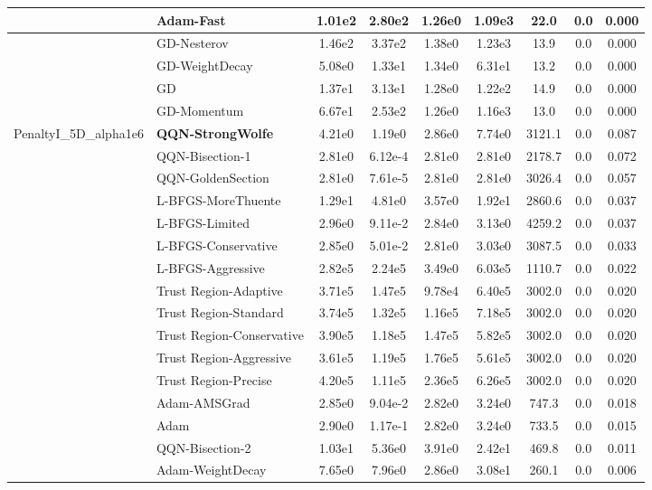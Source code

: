 \documentclass[10pt]{article}
\begin{document}
\begin{longtable}{|l|l|c|c|c|c|c|c|c|}
\hline
 & Adam-Fast & 1.01e2 & 2.80e2 & 1.26e0 & 1.09e3 & 22.0 & 0.0 & 0.000 \\
\hline
 & GD-Nesterov & 1.46e2 & 3.37e2 & 1.38e0 & 1.23e3 & 13.9 & 0.0 & 0.000 \\
\hline
 & GD-WeightDecay & 5.08e0 & 1.33e1 & 1.34e0 & 6.31e1 & 13.2 & 0.0 & 0.000 \\
\hline
 & GD & 1.37e1 & 3.13e1 & 1.28e0 & 1.22e2 & 14.9 & 0.0 & 0.000 \\
\hline
 & GD-Momentum & 6.67e1 & 2.53e2 & 1.26e0 & 1.16e3 & 13.0 & 0.0 & 0.000 \\
PenaltyI\_5D\_alpha1e6 & \textbf{QQN-StrongWolfe} & 4.21e0 & 1.19e0 & 2.86e0 & 7.74e0 & 3121.1 & 0.0 & 0.087 \\
\hline
 & QQN-Bisection-1 & 2.81e0 & 6.12e-4 & 2.81e0 & 2.81e0 & 2178.7 & 0.0 & 0.072 \\
\hline
 & QQN-GoldenSection & 2.81e0 & 7.61e-5 & 2.81e0 & 2.81e0 & 3026.4 & 0.0 & 0.057 \\
\hline
 & L-BFGS-MoreThuente & 1.29e1 & 4.81e0 & 3.57e0 & 1.92e1 & 2860.6 & 0.0 & 0.037 \\
\hline
 & L-BFGS-Limited & 2.96e0 & 9.11e-2 & 2.84e0 & 3.13e0 & 4259.2 & 0.0 & 0.037 \\
\hline
 & L-BFGS-Conservative & 2.85e0 & 5.01e-2 & 2.81e0 & 3.03e0 & 3087.5 & 0.0 & 0.033 \\
\hline
 & L-BFGS-Aggressive & 2.82e5 & 2.24e5 & 3.49e0 & 6.03e5 & 1110.7 & 0.0 & 0.022 \\
\hline
 & Trust Region-Adaptive & 3.71e5 & 1.47e5 & 9.78e4 & 6.40e5 & 3002.0 & 0.0 & 0.020 \\
\hline
 & Trust Region-Standard & 3.74e5 & 1.32e5 & 1.16e5 & 7.18e5 & 3002.0 & 0.0 & 0.020 \\
\hline
 & Trust Region-Conservative & 3.90e5 & 1.18e5 & 1.47e5 & 5.82e5 & 3002.0 & 0.0 & 0.020 \\
\hline
 & Trust Region-Aggressive & 3.61e5 & 1.19e5 & 1.76e5 & 5.61e5 & 3002.0 & 0.0 & 0.020 \\
\hline
 & Trust Region-Precise & 4.20e5 & 1.11e5 & 2.36e5 & 6.26e5 & 3002.0 & 0.0 & 0.020 \\
\hline
 & Adam-AMSGrad & 2.85e0 & 9.04e-2 & 2.82e0 & 3.24e0 & 747.3 & 0.0 & 0.018 \\
\hline
 & Adam & 2.90e0 & 1.17e-1 & 2.82e0 & 3.24e0 & 733.5 & 0.0 & 0.015 \\
\hline
 & QQN-Bisection-2 & 1.03e1 & 5.36e0 & 3.91e0 & 2.42e1 & 469.8 & 0.0 & 0.011 \\
\hline
 & Adam-WeightDecay & 7.65e0 & 7.96e0 & 2.86e0 & 3.08e1 & 260.1 & 0.0 & 0.006 \\

\end{longtable}
\end{document}

